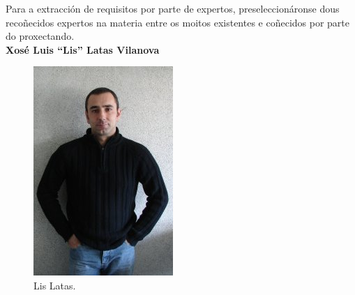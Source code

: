   Para a extracción de requisitos por parte de expertos, preseleccionáronse
  dous recoñecidos expertos na materia entre os moitos existentes e coñecidos
  por parte do proxectando. \\

  \textbf{Xosé Luis ``Lis'' Latas Vilanova}

  \begin{figure}[htbp]
   \centering
   \includegraphics[keepaspectratio=true]{./imagenes/lis-latas.jpg}
   \caption{Lis Latas.}
   \label{figura:LisLatas}
  \end{figure}

